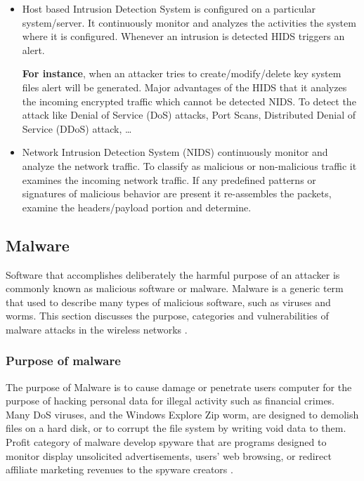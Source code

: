 \documentclass{ijitcs}
\begin{document}
\begin{itemize}
    \item  Host based Intrusion Detection System is configured on a particular system/server. It continuously monitor and analyzes the activities the system where it is configured. Whenever an intrusion is detected HIDS triggers an alert.
    
  \textbf{For instance}, when an attacker tries to create/modify/delete key system files alert will be generated. Major advantages of the HIDS that it analyzes the incoming encrypted traffic which cannot be detected NIDS. To detect the attack like Denial of Service (DoS) attacks, Port Scans, Distributed Denial of Service (DDoS) attack, \dots
  
    \item    Network Intrusion Detection System (NIDS) continuously monitor and analyze the network traffic. To classify as malicious or non-malicious traffic it examines the incoming network traffic. If any predefined patterns or signatures of malicious behavior are present it re-assembles the packets, examine the headers/payload portion and determine.
\end{itemize}

\subsection{Malware}
Software that accomplishes deliberately the harmful purpose of an attacker is commonly known as malicious software or malware. Malware is a generic term that
used to describe many types of malicious software, such as viruses and worms.
This section discusses the purpose, categories and vulnerabilities of malware attacks in the wireless networks \cite{divya2013survey}.
\subsubsection{Purpose of malware}
The purpose of Malware is to cause damage or penetrate users computer for the purpose of hacking personal data for illegal activity such as financial crimes. Many DoS viruses, and the
Windows Explore Zip worm, are designed to demolish files on a hard disk, or to corrupt the file system by writing void data to them. Profit category of malware develop spyware that are programs designed to monitor display unsolicited advertisements, users' web browsing, or
redirect affiliate marketing revenues to the spyware creators  \cite{divya2013survey}.
\end{document}
